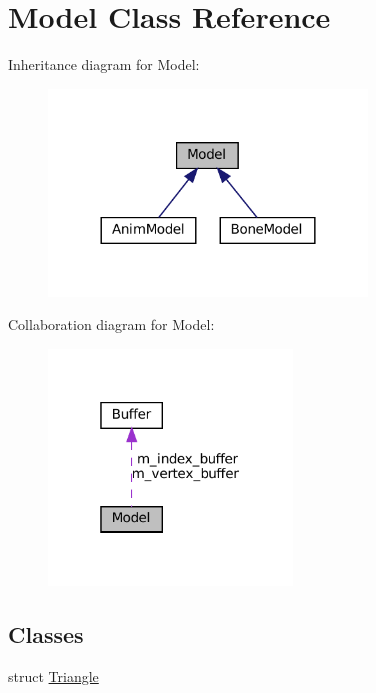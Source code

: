 \hypertarget{classModel}{}\section{Model Class Reference}
\label{classModel}


Inheritance diagram for Model\+:\nopagebreak
\begin{figure}[H]
\begin{center}
\leavevmode
\includegraphics[width=240pt]{classModel__inherit__graph}
\end{center}
\end{figure}


Collaboration diagram for Model\+:\nopagebreak
\begin{figure}[H]
\begin{center}
\leavevmode
\includegraphics[width=184pt]{classModel__coll__graph}
\end{center}
\end{figure}
\subsection*{Classes}
\begin{DoxyCompactItemize}
\item 
struct \hyperlink{structModel_1_1Triangle}{Triangle}
\end{DoxyCompactItemize}
